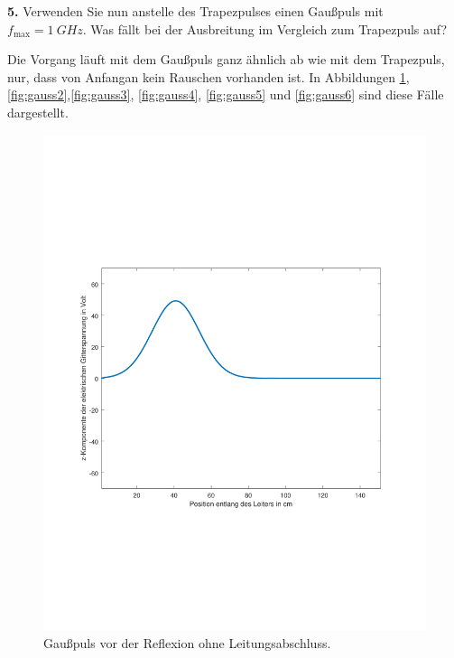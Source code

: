 \documentclass[Protokollheft.tex]{subfiles}
\begin{document}
\begin{framed}
	\noindent \textbf{5.} Verwenden Sie nun anstelle des Trapezpulses einen Gaußpuls
mit $f_{\text{max}}=\SI{1}{GHz}$. Was fällt bei der Ausbreitung im Vergleich
zum Trapezpuls auf?\label{exer:gaussExcitation}
\end{framed}
\noindent
Die Vorgang läuft mit dem Gaußpuls ganz ähnlich ab wie mit dem Trapezpuls, nur, dass von Anfangan kein Rauschen vorhanden ist. In Abbildungen  \ref{fig:gauss1},\ref{fig:gauss2},\ref{fig:gauss3}, \ref{fig:gauss4}, \ref{fig:gauss5} und \ref{fig:gauss6} sind diese Fälle dargestellt.
\begin{figure}[ht]
	\centering
	\includegraphics[trim = 20mm 65mm 20mm 65mm, clip,width=0.7\linewidth]{untitled1.pdf}
	\caption{Gaußpuls vor der Reflexion ohne Leitungsabschluss.}\label{fig:gauss1}
\end{figure}
\end{document}
